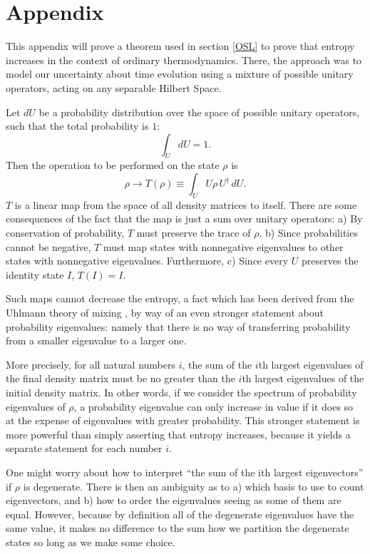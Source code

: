 \documentclass[12pt]{article}
\begin{document}
\section*{Appendix}

This appendix will prove a theorem used in section \ref{OSL} to prove that entropy increases in the context of ordinary thermodynamics.  There, the approach was to model our uncertainty about time evolution using a mixture of possible unitary operators, acting on any separable Hilbert Space.

Let $dU$ be a probability distribution over the space of possible unitary operators, such that the total probability is $1$:
\begin{equation}
\int_U dU = 1.
\end{equation}
Then the operation to be performed on the state $\rho$ is
\begin{equation}
\rho \to T(\rho) \equiv \int_U U \rho\,U^\dagger\,dU.
\end{equation}
$T$ is a linear map from the space of all density matrices to itself.  There are some consequences of the fact that the map is just a sum over unitary operators:  a) By conservation of probability, $T$ must preserve the trace of $\rho$.  b) Since probabilities cannot be negative, $T$ must map states with nonnegative eigenvalues to other states with nonnegative eigenvalues.  Furthermore, c) Since every $U$ preserves the identity state $I$, $T(I) = I$.  

Such maps cannot decrease the entropy, a fact which has been derived from the Uhlmann theory of mixing \cite{Uhlmann}, by way of an even stronger statement about probability eigenvalues: namely that there is no way of transferring probability from a smaller eigenvalue to a larger one.  

More precisely, for all natural numbers $i$, the sum of the $i$th largest eigenvalues of the final density matrix must be no greater than the $i$th largest eigenvalues of the initial density matrix.  In other words, if we consider the spectrum of probability eigenvalues of $\rho$, a probability eigenvalue can only increase in value if it does so at the expense of eigenvalues with greater probability.  This stronger statement is more powerful than simply asserting that entropy increases, because it yields a separate statement for each number $i$.

One might worry about how to interpret ``the sum of the ith largest eigenvectors'' if $\rho$ is degenerate.  There is then an ambiguity as to a) which basis to use to count eigenvectors, and b) how to order the eigenvalues seeing as some of them are equal.   However, because by definition all of the degenerate eigenvalues have the same value, it makes no difference to the sum how we partition the degenerate states so long as we make some choice.
\end{document}
